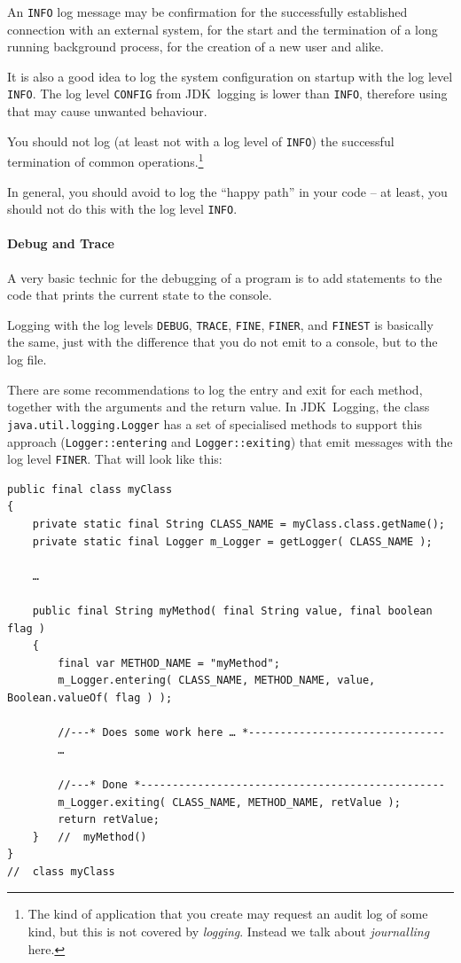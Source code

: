 \documentclass[11pt,a4paper, titlepage, parskip=half, headsepline, footsepline, cleardoublepage=current, headheight=1cm]{scrbook}
\begin{document}
An \verb#INFO# log message may be confirmation for the successfully established connection with an external system, for the start and the termination of a long running background process, for the creation of a new user and alike.

It is also a good idea to log the system configuration on startup with the log level \verb#INFO#. The log level \verb#CONFIG# from JDK~logging is lower than \verb#INFO#, therefore using that may cause unwanted behaviour. 

You should not log (at least not with a log level of \verb#INFO#) the successful termination of common operations.\footnote{The kind of application that you create may request an audit log of some kind, but this is not covered by \textit{logging}. Instead we talk about \textit{journalling} here.}

In general, you should avoid to log the “happy path” in your code – at least, you should not do this with the log level \verb#INFO#.

\paragraph{Debug and Trace} A very basic technic for the debugging of a program is to add statements to the code that prints the current state to the console.

Logging with the log levels \verb#DEBUG#, \verb#TRACE#, \verb#FINE#, \verb#FINER#, and \verb#FINEST# is basically the same, just with the difference that you do not emit to a console, but to the log file.

There are some recommendations to log the entry and exit for each method, together with the arguments and the return value. In JDK~Logging, the class \lstinline|java.util.logging.Logger| has a set of specialised methods to support this approach (\lstinline|Logger::entering| and \lstinline|Logger::exiting|) that emit messages with the log level \verb#FINER#. That will look like this:
\begin{lstlisting}
public final class myClass
{
    private static final String CLASS_NAME = myClass.class.getName();
    private static final Logger m_Logger = getLogger( CLASS_NAME );
    
	…    
    
    public final String myMethod( final String value, final boolean flag )
    {
        final var METHOD_NAME = "myMethod";
        m_Logger.entering( CLASS_NAME, METHOD_NAME, value, Boolean.valueOf( flag ) );
        
        //---* Does some work here … *-------------------------------
        …
    
        //---* Done *------------------------------------------------
        m_Logger.exiting( CLASS_NAME, METHOD_NAME, retValue );
        return retValue;
    }   //  myMethod()
}
//  class myClass
\end{lstlisting}
\end{document}
